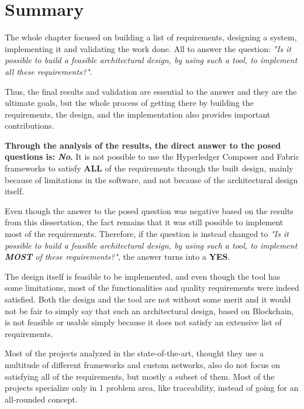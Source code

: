 \section{Summary}

The whole chapter focused on building a list of requirements, designing a system, implementing it and validating the work done. All to answer the question: \textit{"Is it possible to build a feasible architectural design, by using such a tool, to implement all these requirements?"}.

Thus, the final results and validation are essential to the answer and they are the ultimate goals, but the whole process of getting there by building the requirements, the design, and the implementation also provides important contributions.


\textbf{Through the analysis of the results, the direct answer to the posed questions is: \textit{No}.} It is not possible to use the Hyperledger Composer and Fabric frameworks to satisfy \textbf{ALL} of the requirements through the built design, mainly because of limitations in the software, and not because of the architectural design itself.

Even though the answer to the posed question was negative based on the results from this dissertation, the fact remains that it was still possible to implement most of the requirements. Therefore, if the question is instead changed to \textit{"Is it possible to build a feasible architectural design, by using such a tool, to implement \textbf{MOST} of these requirements?"}, the answer turns into a \textbf{YES}. 

The design itself is feasible to be implemented, and even though the tool has some limitations, most of the functionalities and quality requirements were indeed satisfied. Both the design and the tool are not without some merit and it would not be fair to simply say that such an architectural design, based on Blockchain, is not feasible or usable simply because it does not satisfy an extensive list of requirements.




Most of the projects analyzed in the state-of-the-art, thought they use a multitude of different frameworks and custom networks, also do not focus on satisfying all of the requirements, but mostly a subset of them. Most of the projects specialize only in 1 problem area, like traceability, instead of going for an all-rounded concept.
